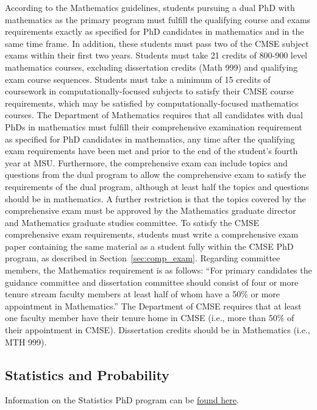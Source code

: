 According to the Mathematics guidelines, students pursuing a dual PhD
with mathematics as the primary program must fulfill the qualifying
course and exams requirements exactly as specified for PhD candidates
in mathematics and in the same time frame.  In addition, these
students must pass two of the CMSE subject exams within their first
two years.  Students must take 21 credits of 800-900 level mathematics
courses, excluding dissertation credits (Math 999) and qualifying exam
course sequences.  Students must take a minimum of 15 credits of
coursework in computationally-focused subjects to satisfy their CMSE
course requirements, which may be satisfied by computationally-focused
mathematics courses.
The Department of Mathematics requires that all candidates with dual
PhDs in mathematics must fulfill their comprehensive examination
requirement as specified for PhD candidates in mathematics, any time
after the qualifying exam requirements have been met and prior to the
end of the student's fourth year at MSU.  Furthermore, the
comprehensive exam can include topics and questions from the dual
program to allow the comprehensive exam to satisfy the requirements of
the dual program, although at least half the topics and questions
should be in mathematics.  A further restriction is that the topics
covered by the comprehensive exam must be approved by the Mathematics
graduate director and Mathematics graduate studies committee.  To
satisfy the CMSE comprehensive exam requirements, students must write
a comprehensive exam paper containing the same material as a student
fully within the CMSE PhD program, as described in
Section~\ref{sec:comp_exam}.  Regarding committee members, the
Mathematics requirement is as follows: ``For primary candidates the
guidance committee and dissertation committee should consist of four
or more tenure stream faculty members at least half of whom have a
50\% or more appointment in Mathematics.''  The Department of CMSE
requires that at least one faculty member have their tenure home in
CMSE (i.e., more than 50\% of their appointment in CMSE).
Dissertation credits should be in Mathematics (i.e., MTH 999).


\subsection{Statistics and Probability}

Information on the Statistics PhD program can be
\href{https://www.stt.msu.edu/Graduate_Program/handbook/PHDREQ.pdf}{found
  here}.


